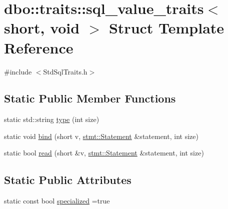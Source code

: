 \hypertarget{structdbo_1_1traits_1_1sql__value__traits_3_01short_00_01void_01_4}{\section{dbo\+:\+:traits\+:\+:sql\+\_\+value\+\_\+traits$<$ short, void $>$ Struct Template Reference}
\label{structdbo_1_1traits_1_1sql__value__traits_3_01short_00_01void_01_4}
}


{\ttfamily \#include $<$Std\+Sql\+Traits.\+h$>$}

\subsection*{Static Public Member Functions}
\begin{DoxyCompactItemize}
\item 
static std\+::string \hyperlink{structdbo_1_1traits_1_1sql__value__traits_3_01short_00_01void_01_4_ac57b46adba46d6e1f8425dd43b1b2cec}{type} (int size)
\item 
static void \hyperlink{structdbo_1_1traits_1_1sql__value__traits_3_01short_00_01void_01_4_a4979e764123d914551319444ab8e4cc1}{bind} (short v, \hyperlink{classdbo_1_1stmt_1_1_statement}{stmt\+::\+Statement} \&statement, int size)
\item 
static bool \hyperlink{structdbo_1_1traits_1_1sql__value__traits_3_01short_00_01void_01_4_a18b5c5a2243ebb84a9fe874d91f1ac4d}{read} (short \&v, \hyperlink{classdbo_1_1stmt_1_1_statement}{stmt\+::\+Statement} \&statement, int size)
\end{DoxyCompactItemize}
\subsection*{Static Public Attributes}
\begin{DoxyCompactItemize}
\item 
static const bool \hyperlink{structdbo_1_1traits_1_1sql__value__traits_3_01short_00_01void_01_4_aff786ebbd2068ab6fc4ac329989c3ce6}{specialized} =true
\end{DoxyCompactItemize}


